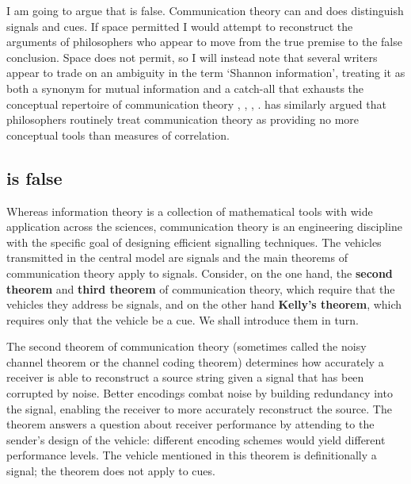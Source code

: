 \documentclass[12pt]{article}
\begin{document}
I am going to argue that \act{} is false.
Communication theory can and does distinguish signals and cues.
If space permitted I would attempt to reconstruct the arguments of philosophers who appear to move from the true premise to the false conclusion.
Space does not permit, so I will instead note that several writers appear to trade on an ambiguity in the term `Shannon information', treating it as both a synonym for mutual information and a catch-all that exhausts the conceptual repertoire of communication theory \citep[p. 1 and $\S$2]{godfrey-smith2016biological}, \citep[759]{owren2010redefining}, \citep[106]{dennett2017bacteria}, \citep[p. 12, n. 11 and p. 78, n. 5]{shea2018representation}.
\citet[1216]{martinez2019representations} has similarly argued that philosophers routinely treat communication theory as providing no more conceptual tools than measures of correlation.

\subsection{\act{} is false}\label{subsec:actFalse}

Whereas information theory is a collection of mathematical tools with wide application across the sciences, communication theory is an engineering discipline with the specific goal of designing efficient signalling techniques.
The vehicles transmitted in the central model are signals and the main theorems of communication theory apply to signals.
Consider, on the one hand, the \textbf{second theorem} and \textbf{third theorem} of communication theory, which require that the vehicles they address be signals, and on the other hand \textbf{Kelly's theorem}, which requires only that the vehicle be a cue.
We shall introduce them in turn.

The second theorem of communication theory (sometimes called the noisy channel theorem or the channel coding theorem) determines how accurately a receiver is able to reconstruct a source string given a signal that has been corrupted by noise.
Better encodings combat noise by building redundancy into the signal, enabling the receiver to more accurately reconstruct the source.
The theorem answers a question about receiver performance by attending to the sender's design of the vehicle: different encoding schemes would yield different performance levels.
The vehicle mentioned in this theorem is definitionally a signal; the theorem does not apply to cues.
\end{document}
